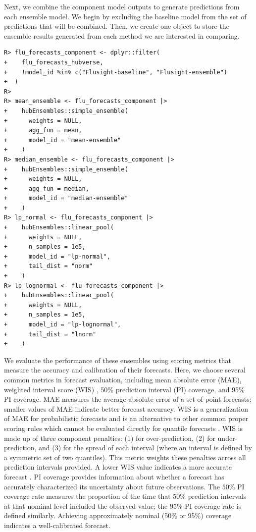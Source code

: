 \documentclass[
  article,
  shortnames,
  notitle]{jss}
\begin{document}
Next, we combine the component model outputs to generate predictions
from each ensemble model. We begin by excluding the baseline model from
the set of predictions that will be combined. Then, we create one object
to store the ensemble results generated from each method we are
interested in comparing.

\begin{verbatim}
R> flu_forecasts_component <- dplyr::filter(
+    flu_forecasts_hubverse,
+    !model_id %in% c("Flusight-baseline", "Flusight-ensemble")
+  )
R> 
R> mean_ensemble <- flu_forecasts_component |>
+    hubEnsembles::simple_ensemble(
+      weights = NULL,
+      agg_fun = mean,
+      model_id = "mean-ensemble"
+    )
R> median_ensemble <- flu_forecasts_component |>
+    hubEnsembles::simple_ensemble(
+      weights = NULL,
+      agg_fun = median,
+      model_id = "median-ensemble"
+    )
R> lp_normal <- flu_forecasts_component |>
+    hubEnsembles::linear_pool(
+      weights = NULL,
+      n_samples = 1e5,
+      model_id = "lp-normal",
+      tail_dist = "norm"
+    )
R> lp_lognormal <- flu_forecasts_component |>
+    hubEnsembles::linear_pool(
+      weights = NULL,
+      n_samples = 1e5,
+      model_id = "lp-lognormal",
+      tail_dist = "lnorm"
+    ) 
\end{verbatim}

We evaluate the performance of these ensembles using scoring metrics
that measure the accuracy and calibration of their forecasts. Here, we
choose several common metrics in forecast evaluation, including mean
absolute error (MAE), weighted interval score (WIS)
\citep{bracher_evaluating_2021}, 50\% prediction interval (PI) coverage,
and 95\% PI coverage. MAE measures the average absolute error of a set
of point forecasts; smaller values of MAE indicate better forecast
accuracy. WIS is a generalization of MAE for probabilistic forecasts and
is an alternative to other common proper scoring rules which cannot be
evaluated directly for quantile forecasts
\citep{bracher_evaluating_2021}. WIS is made up of three component
penalties: (1) for over-prediction, (2) for under-prediction, and (3)
for the spread of each interval (where an interval is defined by a
symmetric set of two quantiles). This metric weights these penalties
across all prediction intervals provided. A lower WIS value indicates a
more accurate forecast \citep{bracher_evaluating_2021}. PI coverage
provides information about whether a forecast has accurately
characterized its uncertainty about future observations. The \(50\)\% PI
coverage rate measures the proportion of the time that 50\% prediction
intervals at that nominal level included the observed value; the 95\% PI
coverage rate is defined similarly. Achieving approximately nominal
(50\% or 95\%) coverage indicates a well-calibrated forecast.
\end{document}
